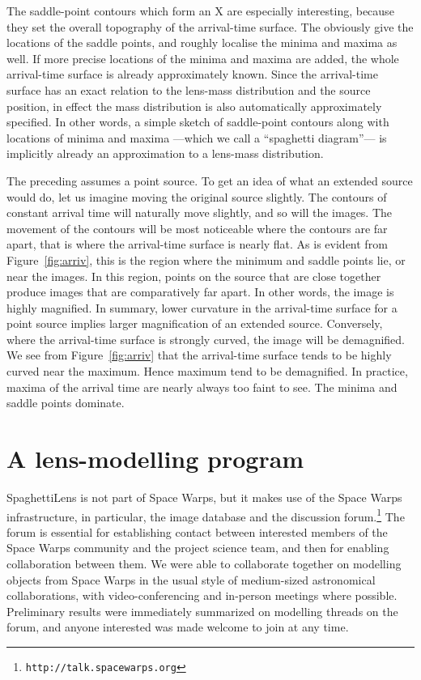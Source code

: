 \documentclass[usenatbib]{mn2e}
\newcommand{\spl}{SpaghettiLens\xspace}
\newcommand{\sw}{Space Warps\xspace}
\newcommand{\figref}[1]{Figure~\ref{fig:#1}}
\begin{document}
The saddle-point contours which form an X are especially interesting,
because they set the overall topography of the arrival-time surface.
The obviously give the locations of the saddle points, and roughly
localise the minima and maxima as well.  If more precise locations of
the minima and maxima are added, the whole arrival-time surface is
already approximately known.  Since the arrival-time surface has an
exact relation to the lens-mass distribution and the source position,
in effect the mass distribution is also automatically approximately
specified.  In other words, a simple sketch of saddle-point contours
along with locations of minima and maxima ---which we call a
``spaghetti diagram''--- is implicitly already an approximation to a
lens-mass distribution.

The preceding assumes a point source.  To get an idea of what an
extended source would do, let us imagine moving the original source
slightly.  The contours of constant arrival time will naturally move
slightly, and so will the images.  The movement of the contours will
be most noticeable where the contours are far apart, that is where the
arrival-time surface is nearly flat.  As is evident from
\figref{arriv}, this is the region where the minimum and saddle points
lie, or near the images.  In this region, points on the source that
are close together produce images that are comparatively far apart.
In other words, the image is highly magnified.  In summary, lower
curvature in the arrival-time surface for a point source implies
larger magnification of an extended source.  Conversely, where the
arrival-time surface is strongly curved, the image will be
demagnified.  We see from \figref{arriv} that the arrival-time surface
tends to be highly curved near the maximum.  Hence maximum tend to be
demagnified.  In practice, maxima of the arrival time are nearly
always too faint to see. The minima and saddle points dominate.



\section{A lens-modelling program} 
\label{sec:SpaghettiLens}

\spl is not part of \sw, but it makes use of the \sw infrastructure,
in particular, the image database and the discussion
forum.\footnote{\tt http://talk.spacewarps.org}  The forum is
essential for establishing contact between interested members of the
\sw community and the project science team, and then for enabling
collaboration between them. We were able to collaborate together on 
modelling objects from \sw in the usual style of medium-sized
astronomical collaborations, with video-conferencing and in-person
meetings where possible. Preliminary results were immediately
summarized on modelling threads on the forum, and anyone interested
was made welcome to join at any time.
\end{document}
